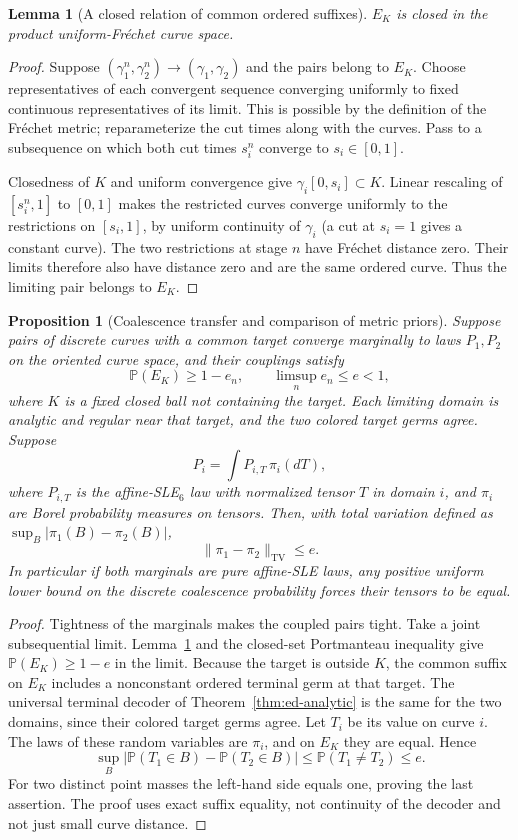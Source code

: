 \documentclass[11pt]{article}
\newtheorem{proposition}[theorem]{Proposition}
\newtheorem{lemma}[theorem]{Lemma}
\theoremstyle{definition}\newtheorem{definition}[theorem]{Definition}
\theoremstyle{remark}\newtheorem{remark}[theorem]{Remark}
\begin{document}
\begin{lemma}[A closed relation of common ordered suffixes]
\label{lem:cb-closed}
$E_K$ is closed in the product uniform-Fr\'echet curve space.
\end{lemma}
\begin{proof}
Suppose $(\gamma_1^n,\gamma_2^n)\to(\gamma_1,\gamma_2)$ and the pairs
belong to $E_K$. Choose representatives of each convergent sequence
converging uniformly to fixed continuous representatives of its limit.
This is possible by the definition of the Fr\'echet metric; reparameterize
the cut times along with the curves. Pass to a subsequence on which both
cut times $s_i^n$ converge to $s_i\in[0,1]$.

Closedness of $K$ and uniform convergence give
$\gamma_i[0,s_i]\subset K$. Linear rescaling of $[s_i^n,1]$ to $[0,1]$ makes
the restricted curves converge uniformly to the restrictions on
$[s_i,1]$, by uniform continuity of $\gamma_i$ (a cut at $s_i=1$
gives a constant curve). The two restrictions
at stage $n$ have Fr\'echet distance zero. Their limits therefore also
have distance zero and are the same ordered curve. Thus the limiting
pair belongs to $E_K$.
\end{proof}

\begin{proposition}[Coalescence transfer and comparison of metric priors]
\label{prop:cb-priors}
Suppose pairs of discrete curves with a common target converge marginally
to laws $P_1,P_2$ on the oriented curve space, and their couplings satisfy
\[
 \mathbb P(E_K)\ge1-e_n,\qquad \limsup_n e_n\le e<1,
 \tag{CB2}
\]
where $K$ is a fixed closed ball not containing the target. Each limiting
domain is analytic and regular near that target, and the two colored
target germs agree. Suppose
\[
 P_i=\int P_{i,T}\,\pi_i(dT),
 \tag{CB3}
\]
where $P_{i,T}$ is the affine-SLE$_6$ law with normalized tensor $T$ in
domain $i$, and $\pi_i$ are Borel probability measures on tensors.
Then, with total variation defined as $\sup_B|\pi_1(B)-\pi_2(B)|$,
\[
 \|\pi_1-\pi_2\|_{\mathrm{TV}}\le e.
 \tag{CB4}
\]
In particular if both marginals are pure affine-SLE laws, any positive
uniform lower bound on the discrete coalescence probability forces their
tensors to be equal.
\end{proposition}
\begin{proof}
Tightness of the marginals makes the coupled pairs tight. Take a joint
subsequential limit. Lemma~\ref{lem:cb-closed} and the closed-set
Portmanteau inequality give $\mathbb P(E_K)\ge1-e$ in the limit.
Because the target is outside $K$, the common suffix on $E_K$ includes
a nonconstant ordered terminal germ at that target. The universal
terminal decoder of Theorem~\ref{thm:ed-analytic} is the same for the
two domains, since their colored target germs agree. Let $T_i$ be its
value on curve $i$. The laws of these random variables are $\pi_i$,
and on $E_K$ they are equal. Hence
\[
 \sup_B|\mathbb P(T_1\in B)-\mathbb P(T_2\in B)|
       \le\mathbb P(T_1\ne T_2)\le e.
\]
For two distinct point masses the left-hand side equals one, proving the
last assertion. The proof uses exact suffix equality, not continuity of
the decoder and not just small curve distance.
\end{proof}
\end{document}
